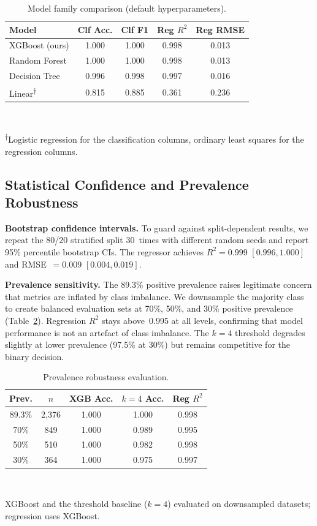 \documentclass[conference, 10pt]{IEEEtran}
\begin{document}
\begin{table}[tb]
\centering
\caption{Model family comparison (default hyperparameters).}
\label{tab:modelfamily}
\begin{tabular}{lcccc}
\toprule
Model & Clf Acc. & Clf F1 & Reg $R^2$ & Reg RMSE \\
\midrule
XGBoost (ours)    & 1.000 & 1.000 & 0.998 & 0.013 \\
Random Forest     & 1.000 & 1.000 & 0.998 & 0.013 \\
Decision Tree     & 0.996 & 0.998 & 0.997 & 0.016 \\
Linear\textsuperscript{$\dagger$} & 0.815 & 0.885 & 0.361 & 0.236 \\
\bottomrule
\end{tabular}
\\[2pt]
{\raggedright\footnotesize
\textsuperscript{$\dagger$}Logistic regression for the classification
columns, ordinary least squares for the regression columns.\par}
\end{table}

\subsection{Statistical Confidence and Prevalence Robustness}
\label{sec:confidence}

\textbf{Bootstrap confidence intervals.} To guard against split-dependent
results, we repeat the 80/20 stratified split 30~times with different
random seeds and report 95\% percentile bootstrap CIs.
The regressor achieves $R^2 = 0.999$
$[0.996, 1.000]$ and RMSE~$= 0.009$ $[0.004, 0.019]$.

\textbf{Prevalence sensitivity.} The 89.3\% positive prevalence
raises legitimate concern that metrics are inflated by class
imbalance. We downsample the majority class to create balanced
evaluation sets at 70\%, 50\%, and 30\% positive prevalence
(Table~\ref{tab:prevalence}).
Regression
$R^2$ stays above~0.995 at all levels, confirming that model
performance is not an artefact of class imbalance.
The $k{=}4$ threshold degrades slightly at
lower prevalence (97.5\% at 30\%) but remains competitive for the
binary decision.

\begin{table}[tb]
\centering
\caption{Prevalence robustness evaluation.}
\label{tab:prevalence}
\begin{tabular}{ccccc}
\toprule
Prev. & $n$ & XGB Acc. & $k{=}4$ Acc. & Reg $R^2$ \\
\midrule
89.3\% & 2{,}376 & 1.000 & 1.000 & 0.998 \\
70\%   &    849 & 1.000 & 0.989 & 0.995 \\
50\%   &    510 & 1.000 & 0.982 & 0.998 \\
30\%   &    364 & 1.000 & 0.975 & 0.997 \\
\bottomrule
\end{tabular}
\\[2pt]
{\raggedright\footnotesize
XGBoost and the threshold baseline ($k{=}4$) evaluated on downsampled
datasets; regression uses XGBoost.\par}
\end{table}
\end{document}

